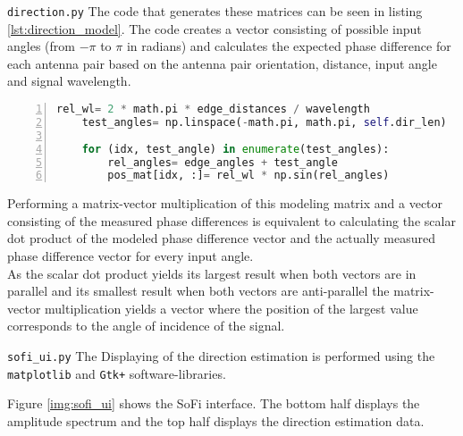 \begin{subchapter}{\texttt{direction.py}}
  The code that generates these matrices can be seen in
  listing \ref{lst:direction_model}.
  The code creates a vector consisting of possible input
  angles (from $-\pi$ to $\pi$ in radians)
  and calculates the expected phase difference for each
  antenna pair based on the antenna pair orientation,
  distance, input angle and signal wavelength.

  \begin{lstlisting}[language=Python, frame=single,
      numbers=left, label={lst:direction_model},
      caption={Code fragment that calculates the receiver model}]
    rel_wl= 2 * math.pi * edge_distances / wavelength
    test_angles= np.linspace(-math.pi, math.pi, self.dir_len)

    for (idx, test_angle) in enumerate(test_angles):
        rel_angles= edge_angles + test_angle
        pos_mat[idx, :]= rel_wl * np.sin(rel_angles)
  \end{lstlisting}

  Performing a matrix-vector multiplication of this modeling matrix
  and a vector consisting of the measured phase differences
  is equivalent to calculating the scalar dot product of the
  modeled phase difference vector and the actually measured
  phase difference vector for every input angle. \\

  As the scalar dot product yields its largest result
  when both vectors are in parallel and its smallest
  result when both vectors are anti-parallel the
  matrix-vector multiplication yields a vector where
  the position of the largest value corresponds to the
  angle of incidence of the signal.
\end{subchapter}

\begin{subchapter}{\texttt{sofi\_ui.py}}
  The Displaying of the direction estimation is performed
  using the \texttt{matplotlib} and \texttt{Gtk+} software-libraries.

  Figure \ref{img:sofi_ui} shows the SoFi interface.
  The bottom half displays the amplitude spectrum and
  the top half displays the direction estimation data. \\
\end{subchapter}
